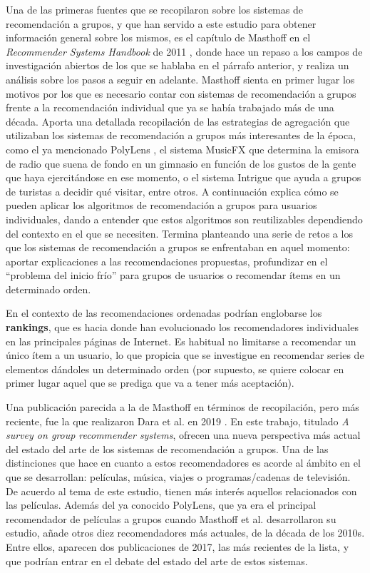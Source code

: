 Una de las primeras fuentes que se recopilaron sobre los sistemas de recomendación a grupos, y que han servido a este estudio para obtener información general sobre los mismos, es el capítulo de Masthoff en el \textit{Recommender Systems Handbook} de 2011 \cite{masthoff-handbook}, donde hace un repaso a los campos de investigación abiertos de los que se hablaba en el párrafo anterior, y realiza un análisis sobre los pasos a seguir en adelante. Masthoff sienta en primer lugar los motivos por los que es necesario contar con sistemas de recomendación a grupos frente a la recomendación individual que ya se había trabajado más de una década. Aporta una detallada recopilación de las estrategias de agregación que utilizaban los sistemas de recomendación a grupos más interesantes de la época, como el ya mencionado PolyLens \cite{polylens}, el sistema MusicFX \cite{musicfx} que determina la emisora de radio que suena de fondo en un gimnasio en función de los gustos de la gente que haya ejercitándose en ese momento, o el sistema Intrigue \cite{intrigue} que ayuda a grupos de turistas a decidir qué visitar, entre otros. A continuación explica cómo se pueden aplicar los algoritmos de recomendación a grupos para usuarios individuales, dando a entender que estos algoritmos son reutilizables dependiendo del contexto en el que se necesiten. Termina planteando una serie de retos a los que los sistemas de recomendación a grupos se enfrentaban en aquel momento: aportar explicaciones a las recomendaciones propuestas, profundizar en el ``problema del inicio frío'' para grupos de usuarios o recomendar ítems en un determinado orden.

En el contexto de las recomendaciones ordenadas podrían englobarse los \textbf{rankings}, que es hacia donde han evolucionado los recomendadores individuales en las principales páginas de Internet. Es habitual no limitarse a recomendar un único ítem a un usuario, lo que propicia que se investigue en recomendar series de elementos dándoles un determinado orden (por supuesto, se quiere colocar en primer lugar aquel que se prediga que va a tener más aceptación).

Una publicación parecida a la de Masthoff en términos de recopilación, pero más reciente, fue la que realizaron Dara et al. en 2019 \cite{survey2019}. En este trabajo, titulado \textit{A survey on group recommender systems}, ofrecen una nueva perspectiva más actual del estado del arte de los sistemas de recomendación a grupos. Una de las distinciones que hace en cuanto a estos recomendadores es acorde al ámbito en el que se desarrollan: películas, música, viajes o programas/cadenas de televisión. De acuerdo al tema de este estudio, tienen más interés aquellos relacionados con las películas. Además del ya conocido PolyLens, que ya era el principal recomendador de películas a grupos cuando Masthoff et al. desarrollaron su estudio, añade otros diez recomendadores más actuales, de la década de los 2010s. Entre ellos, aparecen dos publicaciones de 2017, las más recientes de la lista, y que podrían entrar en el debate del estado del arte de estos sistemas.

